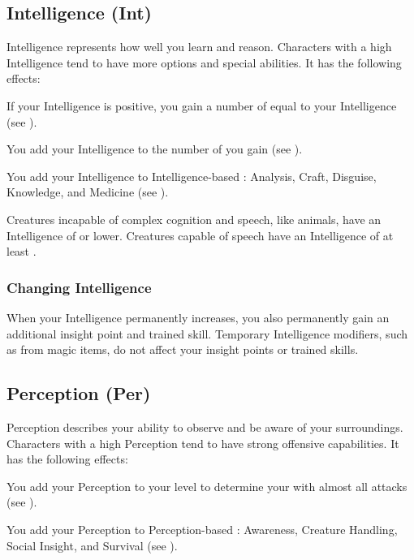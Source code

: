   \subsection{Intelligence (Int)}\label{Intelligence}
    {
      Intelligence represents how well you learn and reason.
      Characters with a high Intelligence tend to have more options and special abilities.
      It has the following effects:

      \begin{raggeditemize}
        \item If your Intelligence is positive, you gain a number of  equal to your Intelligence (see ).
        \item You add your Intelligence to the number of  you gain (see ).
        \item You add your Intelligence to Intelligence-based : Analysis, Craft, Disguise, Knowledge, and Medicine (see ).
      \end{raggeditemize}

      \par Creatures incapable of complex cognition and speech, like animals, have an Intelligence of  or lower.
      Creatures capable of speech have an Intelligence of at least .
    }

    \subsubsection{Changing Intelligence}\label{Changing Intelligence}
      When your Intelligence permanently increases, you also permanently gain an additional insight point and trained skill.
      Temporary Intelligence modifiers, such as from magic items, do not affect your insight points or trained skills.

  \subsection{Perception (Per)}\label{Perception}
    {
      Perception describes your ability to observe and be aware of your surroundings.
      Characters with a high Perception tend to have strong offensive capabilities.
      It has the following effects:
      \begin{raggeditemize}
        \item You add your Perception to your level to determine your  with almost all attacks (see ).
        \item You add your Perception to Perception-based : Awareness, Creature Handling, Social Insight, and Survival (see ).
      \end{raggeditemize}
    }

